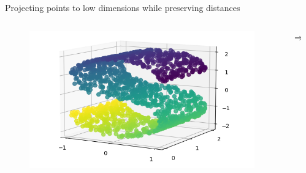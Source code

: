 \documentclass{beamer}
\begin{document}


\begin{frame}{Projecting points to low dimensions while preserving distances}
    \begin{columns}
        \begin{column}{0.4\textwidth}
            \begin{figure}
                \includegraphics[width=1.4\textwidth]{standalone/mds_1.png}
                
            \end{figure}   
        \end{column}
        \begin{column}{0.01\textwidth}
            \huge{$\Longrightarrow$}
            
        \end{column}
        \begin{column}{0.4\textwidth}
            
        \end{column}
    \end{columns}
    \centering
    \vfill
    \tiny{\cite{scikit-learn}}
\end{frame}
\end{document}
